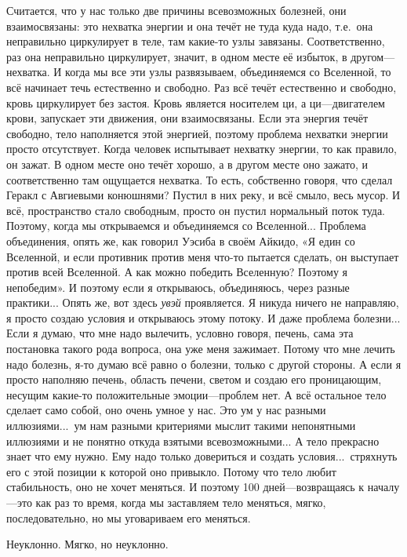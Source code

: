 \T
Считается, что у нас только две причины
всевозможных болезней, они взаимосвязаны: это нехватка энергии и она течёт не
туда куда надо, т.е.\ она неправильно циркулирует в теле, там какие-то узлы завязаны.
Соответственно, раз она
неправильно циркулирует, значит, в одном месте её избыток, в другом---нехватка.
И когда мы все эти узлы
развязываем, объединяемся со Вселенной, то всё начинает течь естественно и свободно.
Раз всё течёт естественно и свободно,
кровь циркулирует без застоя. Кровь является носителем ци, а ци---двигателем
крови, запускает эти движения, они взаимосвязаны. Если эта энергия
течёт свободно, тело наполняется этой энергией, поэтому проблема нехватки энергии
просто отсутствует.
Когда человек испытывает нехватку энергии, то как правило, он зажат. В одном месте оно течёт
хорошо, а в другом месте оно зажато, и соответственно там
ощущается нехватка. То есть, собственно говоря, что сделал Геракл с Авгиевыми конюшнями?
Пустил в них
реку, и всё смыло, весь мусор. И всё, пространство стало свободным, просто он пустил
нормальный поток туда.
Поэтому, когда мы открываемся и объединяемся со Вселенной... Проблема объединения, опять же,
как говорил Уэсиба в своём Айкидо, «Я един со Вселенной,
и если противник против меня что-то пытается сделать, он выступает против всей
Вселенной. А как можно победить Вселенную? Поэтому я непобедим». И поэтому если я открываюсь,
объединяюсь, через разные практики...\hfil\break
\indent
Опять же, вот здесь {\it увэй\/} проявляется. Я никуда ничего не направляю, я просто создаю условия
и открываюсь этому потоку. И даже проблема болезни... Если я думаю, что мне надо вылечить,
условно говоря, печень, сама эта постановка такого рода вопроса, она уже меня зажимает.
Потому что мне лечить надо болезнь, я-то думаю всё равно о болезни, только с другой стороны. А
если я просто наполняю печень, область печени, светом и создаю его проницающим, несущим
какие-то положительные эмоции---проблем нет.
А всё остальное тело сделает само собой, оно очень умное у нас. Это ум у нас разными
иллюзиями...\ ум нам разными критериями мыслит такими непонятными иллюзиями и не понятно
откуда взятыми всевозможными... А тело прекрасно знает что ему
нужно. Ему надо только довериться и создать условия...\ стряхнуть его с этой позиции к которой оно
привыкло. Потому что тело любит стабильность, оно не хочет меняться. И поэтому 100
дней---возвращаясь к началу---это как раз то время, когда мы заставляем тело меняться, мягко,
последовательно, но мы уговариваем его меняться.

\A
Неуклонно. Мягко, но неуклонно.

